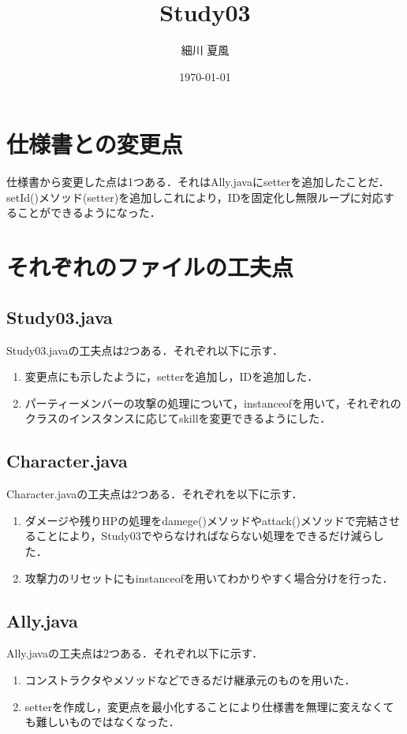 \documentclass{jlreq}
\title{Study03}
\author{細川 夏風}
\date{\today}
\begin{document}
  \maketitle

  \section{仕様書との変更点}
  仕様書から変更した点は1つある．それはAlly.javaにsetterを追加したことだ．setId()メソッド(setter)を追加しこれにより，IDを固定化し無限ループに対応することができるようになった．

  \section{それぞれのファイルの工夫点}
  \subsection{Study03.java}
  Study03.javaの工夫点は$2$つある．それぞれ以下に示す．
  \begin{enumerate}[(1). ]
    \item 変更点にも示したように，setterを追加し，IDを追加した．
    \item パーティーメンバーの攻撃の処理について，instanceofを用いて，それぞれのクラスのインスタンスに応じてskillを変更できるようにした．
  \end{enumerate}

  \subsection{Character.java}
  Character.javaの工夫点は$2$つある．それぞれを以下に示す．
  \begin{enumerate}[(1). ]
    \item ダメージや残りHPの処理をdamege()メソッドやattack()メソッドで完結させることにより，Study03でやらなければならない処理をできるだけ減らした．
    \item 攻撃力のリセットにもinstanceofを用いてわかりやすく場合分けを行った．
  \end{enumerate}

  \subsection{Ally.java}
  Ally.javaの工夫点は$2$つある．それぞれ以下に示す．
  \begin{enumerate}[(1). ]
    \item コンストラクタやメソッドなどできるだけ継承元のものを用いた．
    \item setterを作成し，変更点を最小化することにより仕様書を無理に変えなくても難しいものではなくなった．
  \end{enumerate}
\end{document}
